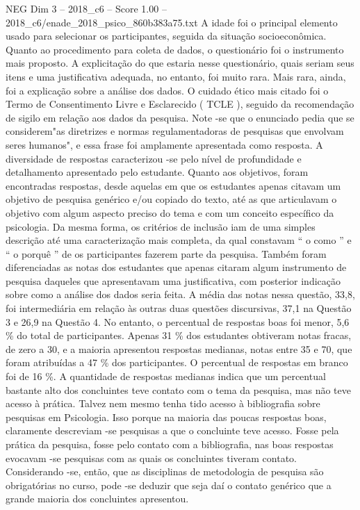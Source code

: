 \begin{textsample}{NEG Dim 3 – 2018\_c6 – Score 1.00 – 2018\_c6/enade\_2018\_psico\_860b383a75.txt}
A idade foi o principal elemento usado para selecionar os participantes, seguida da situação socioeconômica.
Quanto ao procedimento para coleta de dados, o questionário foi o instrumento mais proposto.
A explicitação do que estaria nesse questionário, quais seriam seus itens e uma justificativa adequada, no entanto, foi muito rara.
Mais rara, ainda, foi a explicação sobre a análise dos dados.
O cuidado ético mais citado foi o Termo de Consentimento Livre e Esclarecido ( TCLE ), seguido da recomendação de sigilo em relação aos dados da pesquisa.
Note -se que o enunciado pedia que se considerem"as diretrizes e normas regulamentadoras de pesquisas que envolvam seres humanos", e essa frase foi amplamente apresentada como resposta.
A diversidade de respostas caracterizou -se pelo nível de profundidade e detalhamento apresentado pelo estudante.
Quanto aos objetivos, foram encontradas respostas, desde aquelas em que os estudantes apenas citavam um objetivo de pesquisa genérico e/ou copiado do texto, até as que articulavam o objetivo com algum aspecto preciso do tema e com um conceito específico da psicologia.
Da mesma forma, os critérios de inclusão iam de uma simples descrição até uma caracterização mais completa, da qual constavam “ o como ” e “ o porquê ” de os participantes fazerem parte da pesquisa.
Também foram diferenciadas as notas dos estudantes que apenas citaram algum instrumento de pesquisa daqueles que apresentavam uma justificativa, com posterior indicação sobre como a análise dos dados seria feita.
A média das notas nessa questão, 33,8, foi intermediária em relação às outras duas questões discursivas, 37,1 na Questão 3 e 26,9 na Questão 4.
No entanto, o percentual de respostas boas foi menor, 5,6 \% do total de participantes.
Apenas 31 \% dos estudantes obtiveram notas fracas, de zero a 30, e a maioria apresentou respostas medianas, notas entre 35 e 70, que foram atribuídas a 47 \% dos participantes.
O percentual de respostas em branco foi de 16 \%.
A quantidade de respostas medianas indica que um percentual bastante alto dos concluintes teve contato com o tema da pesquisa, mas não teve acesso à prática.
Talvez nem mesmo tenha tido acesso à bibliografia sobre pesquisas em Psicologia.
Isso porque na maioria das poucas respostas boas, claramente descreviam -se pesquisas a que o concluinte teve acesso.
Fosse pela prática da pesquisa, fosse pelo contato com a bibliografia, nas boas respostas evocavam -se pesquisas com as quais os concluintes tiveram contato.
Considerando -se, então, que as disciplinas de metodologia de pesquisa são obrigatórias no curso, pode -se deduzir que seja daí o contato genérico que a grande maioria dos concluintes apresentou.

\end{textsample}
